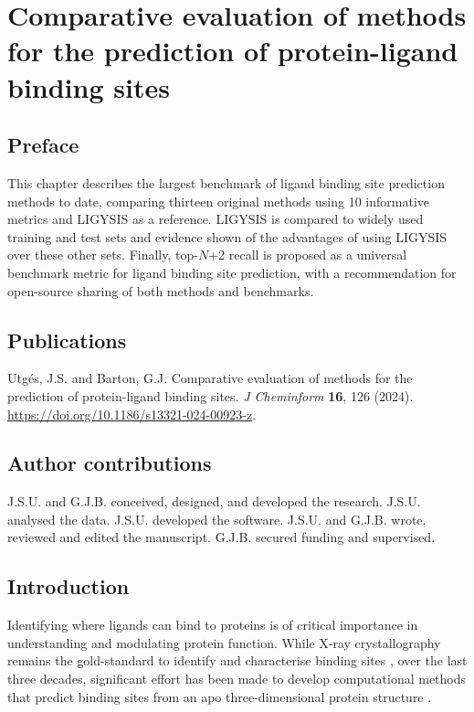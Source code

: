 \chapter{Comparative evaluation of methods for the prediction of protein-ligand binding sites}

\section*{Preface}

This chapter describes the largest benchmark of ligand binding site prediction methods to date, comparing thirteen original methods using 10 informative metrics and LIGYSIS as a reference. LIGYSIS is compared to widely used training and test sets and evidence shown of the advantages of using LIGYSIS over these other sets. Finally, top-$N$+2 recall is proposed as a universal benchmark metric for ligand binding site prediction, with a recommendation for open-source sharing of both methods and benchmarks.

\section*{Publications}

Utgés, J.S. and Barton, G.J. Comparative evaluation of methods for the prediction of protein-ligand binding sites. \textit{J Cheminform} \textbf{16}, 126 (2024). \url{https://doi.org/10.1186/s13321-024-00923-z}.

\section*{Author contributions}

J.S.U. and G.J.B. conceived, designed, and developed the research. J.S.U. analysed the data. J.S.U. developed the software. J.S.U. and G.J.B. wrote, reviewed and edited the manuscript. G.J.B. secured funding and supervised.

\section{Introduction}

Identifying where ligands can bind to proteins is of critical importance in understanding and modulating protein function. While X-ray crystallography remains the gold-standard to identify and characterise binding sites \cite{CONGREVE_2003_RO3, REES_2004_FBLD, MURRAY_2009_FBDD, SCHIEBEL_2016_FRAGMENTS, UTGES_2024_FRAGSYS}, over the last three decades, significant effort has been made to develop computational methods that predict binding sites from an apo three-dimensional protein structure \cite{VOLKAMER_2010_TOPOLOGY}.

